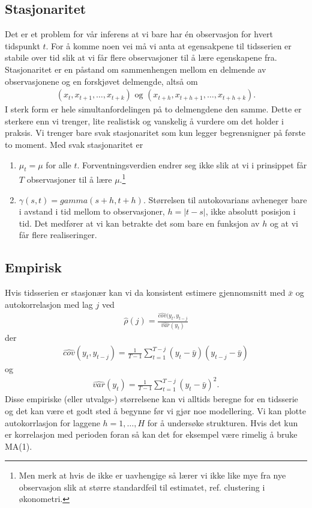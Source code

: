 \subsection{Stasjonaritet}
Det er et problem for vår inferens at vi bare har én observasjon for hvert tidspunkt $t$. For å komme noen vei må vi anta at egensakpene til tidsserien er stabile over tid slik at vi får flere observasjoner til å lære egenskapene fra. Stasjonaritet er en påstand om sammenhengen mellom en delmende av observasjonene og en forskjøvet delmengde, altså om
\begin{align}
(x_t,x_{t+1},\dots, x_{t+k})\text{ og } (x_{t+h},x_{t+h+1},\dots, x_{t+h+k}).
\end{align}
I sterk form er hele simultanfordelingen på to delmengdene den samme. Dette er sterkere enn vi trenger, lite realistisk og vanskelig å vurdere om det holder i praksis. Vi trenger bare svak stasjonaritet som kun legger begrensnigner på første to moment. Med svak stasjonaritet er
\begin{enumerate} 
\item $\mu_t = \mu$ for alle $t$. Forventningsverdien endrer seg ikke slik at vi i prinsippet får $T$ observasjoner til å lære $\mu$.\footnote{Men merk at hvis de ikke er uavhengige så lærer vi ikke like mye fra nye observasjon slik at større standardfeil til estimatet, ref. clustering i økonometri.}
\item $\gamma(s,t)=gamma(s+h, t+h)$. Størrelsen til autokovarians avheneger bare i avstand i tid mellom to observasjoner, $h = |t-s|$, ikke absolutt posisjon i tid. Det medfører at vi kan betrakte det som bare en funksjon av $h$ og at vi får flere realiseringer.
\end{enumerate}
\subsection{Empirisk}
Hvis tidsserien er stasjonær kan vi da konsistent estimere gjennomsnitt med $\bar{x}$ og autokorrelasjon med lag $j$ ved
\begin{align}
\hat{\rho}(j) = \frac{\widehat{cov}(y_t, y_{t-j}}{\widehat{var}(y_t)}
\end{align}
der 
\begin{align}
\widehat{cov}(y_t, y_{t-j}) = \frac{1}{T-1} \sum_{t=1}^{T-j}(y_t-\bar{y})(y_{t-j}-\bar{y})
\end{align}
og
\begin{align}
\widehat{var}(y_t) = \frac{1}{T-1} \sum_{t=1}^{T-j}(y_t-\bar{y})^2.
\end{align}
Disse empiriske (eller utvalgs-) størrelsene kan vi alltids beregne for en tidsserie og det kan være et godt sted å begynne før vi gjør noe modellering. Vi kan plotte autokorrlasjon for laggene $h=1,\dots, H$ for å undersøke strukturen. Hvis det kun er korrelasjon med perioden foran så kan det for eksempel være rimelig å bruke MA(1).
